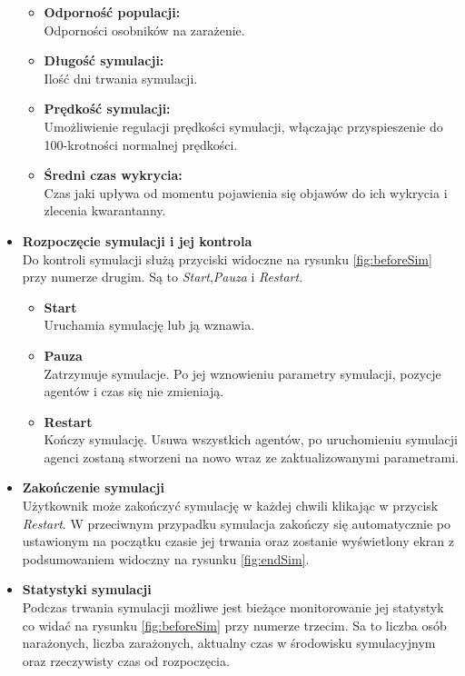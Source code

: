 \begin{itemize}
\begin{itemize}
		\item \textbf{Odporność populacji:}\\
		Odporności osobników na zarażenie.

		\item \textbf{Długość symulacji:}\\
		Ilość dni trwania symulacji.
		
		\item \textbf{Prędkość symulacji:}\\
		Umożliwienie regulacji prędkości symulacji, włączając przyspieszenie do 100-krotności normalnej prędkości.
		
		\item \textbf{Średni czas wykrycia:}\\
		Czas jaki upływa od momentu pojawienia się objawów do ich wykrycia i zlecenia kwarantanny.
	\end{itemize}
	
	\item \textbf{Rozpoczęcie symulacji i jej kontrola}\\
	Do kontroli symulacji służą przyciski widoczne na rysunku \ref{fig:beforeSim} przy numerze drugim. Są to \textit{Start},\textit{Pauza} i \textit{Restart}. 
	
	\begin{itemize}
	\item \textbf{Start}\\
	Uruchamia symulację lub ją wznawia.
	
	\item \textbf{Pauza}\\
	Zatrzymuje symulacje. Po jej wznowieniu parametry symulacji, pozycje agentów i czas się nie zmieniają.
	
	\item \textbf{Restart}\\
	Kończy symulację. Usuwa wszystkich agentów, po uruchomieniu symulacji agenci zostaną stworzeni na nowo wraz ze zaktualizowanymi parametrami.
	\end{itemize}
	
	\item \textbf{Zakończenie symulacji}\\
	Użytkownik może zakończyć symulację w każdej chwili klikając w przycisk \textit{Restart}. W przeciwnym przypadku symulacja zakończy się automatycznie po ustawionym na początku czasie jej trwania oraz zostanie wyświetlony ekran z podsumowaniem widoczny na rysunku \ref{fig:endSim}.
	
	\item \textbf{Statystyki symulacji}\\
	Podczas trwania symulacji możliwe jest bieżące monitorowanie jej statystyk co widać na rysunku \ref{fig:beforeSim} przy numerze trzecim. Sa to liczba osób narażonych, liczba zarażonych, aktualny czas w środowisku symulacyjnym oraz rzeczywisty czas od rozpoczęcia.
\end{itemize}


